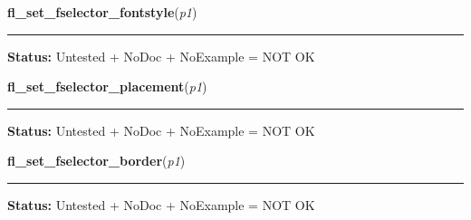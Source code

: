     \vspace{0.5ex}

\hspace{.8\funcindent}\begin{boxedminipage}{\funcwidth}

    \raggedright \textbf{fl\_set\_fselector\_fontstyle}(\textit{p1})

    \vspace{-1.5ex}

    \rule{\textwidth}{0.5\fboxrule}
\setlength{\parskip}{2ex}
\setlength{\parskip}{1ex}
\textbf{Status:} Untested + NoDoc + NoExample = NOT OK



    \end{boxedminipage}

    \label{xformslib:library:fl_set_fselector_placement}

    \vspace{0.5ex}

\hspace{.8\funcindent}\begin{boxedminipage}{\funcwidth}

    \raggedright \textbf{fl\_set\_fselector\_placement}(\textit{p1})

    \vspace{-1.5ex}

    \rule{\textwidth}{0.5\fboxrule}
\setlength{\parskip}{2ex}
\setlength{\parskip}{1ex}
\textbf{Status:} Untested + NoDoc + NoExample = NOT OK



    \end{boxedminipage}

    \label{xformslib:library:fl_set_fselector_border}

    \vspace{0.5ex}

\hspace{.8\funcindent}\begin{boxedminipage}{\funcwidth}

    \raggedright \textbf{fl\_set\_fselector\_border}(\textit{p1})

    \vspace{-1.5ex}

    \rule{\textwidth}{0.5\fboxrule}
\setlength{\parskip}{2ex}
\setlength{\parskip}{1ex}
\textbf{Status:} Untested + NoDoc + NoExample = NOT OK



    \end{boxedminipage}

